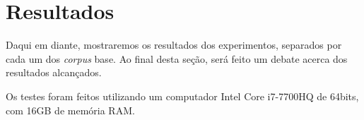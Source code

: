 \section{Resultados}
\label{sec:resultados}
Daqui em diante, mostraremos os resultados dos experimentos, separados por cada um dos \textit{corpus} base. Ao final desta seção, será feito um debate acerca dos resultados alcançados.

Os testes foram feitos utilizando um computador Intel Core i7-7700HQ de 64bits, com 16GB de memória RAM.


